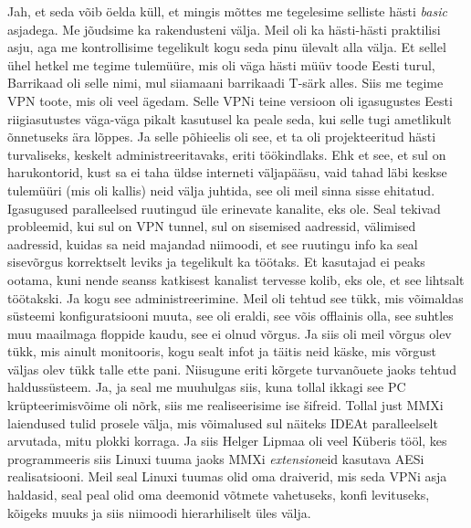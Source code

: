 Jah, et seda võib öelda küll, et mingis mõttes me tegelesime selliste hästi 
\emph{basic} asjadega. Me jõudsime ka rakendusteni välja. Meil oli ka 
hästi-hästi praktilisi asju, aga me kontrollisime tegelikult kogu seda pinu 
ülevalt alla välja. Et sellel ühel hetkel me tegime tulemüüre, mis oli väga 
hästi müüv toode Eesti turul, Barrikaad oli selle nimi, mul 
siiamaani barrikaadi T-särk alles. Siis me tegime VPN toote, mis oli veel 
ägedam. Selle VPNi teine versioon oli igasugustes Eesti riigiasutustes 
väga-väga pikalt kasutusel ka peale seda, kui selle tugi ametlikult õnnetuseks 
ära lõppes. Ja selle põhieelis oli see, et ta oli projekteeritud hästi 
turvaliseks, keskelt administreeritavaks, eriti töökindlaks. Ehk et see, et sul 
on  harukontorid, kust sa ei taha üldse interneti väljapääsu, vaid tahad läbi 
keskse tulemüüri (mis oli kallis) neid välja juhtida, see oli meil sinna sisse 
ehitatud. Igasugused paralleelsed ruutingud üle erinevate kanalite, eks ole. 
Seal tekivad probleemid, kui sul on VPN tunnel, sul on  sisemised aadressid, 
välimised aadressid, kuidas sa neid majandad niimoodi, et see ruutingu info ka 
seal sisevõrgus korrektselt leviks ja tegelikult ka töötaks. Et kasutajad 
ei peaks  ootama, kuni nende seanss katkisest kanalist tervesse kolib, eks ole, 
et see lihtsalt töötakski. Ja kogu see administreerimine. Meil oli tehtud see 
tükk, mis võimaldas süsteemi konfiguratsiooni muuta, see oli eraldi, see võis 
offlainis olla, see suhtles  muu maailmaga floppide kaudu, see ei olnud võrgus. 
Ja siis oli meil võrgus olev tükk, mis ainult monitooris, kogu sealt infot ja 
täitis neid käske, mis võrgust väljas olev tükk talle  ette pani. Niisugune 
eriti kõrgete turvanõuete jaoks tehtud haldussüsteem. Ja, ja seal me muuhulgas 
siis, kuna tollal ikkagi see PC krüpteerimisvõime oli nõrk, siis me 
realiseerisime ise  šifreid. Tollal just MMXi laiendused tulid prosele välja, 
mis võimalused sul näiteks IDEAt paralleelselt arvutada, mitu plokki korraga. Ja siis 
Helger Lipmaa oli veel Küberis tööl, kes 
programmeeris siis Linuxi tuuma jaoks MMXi \emph{extension}eid  kasutava 
AESi  
realisatsiooni. Meil seal Linuxi tuumas olid oma draiverid, mis 
seda VPNi asja haldasid, seal peal olid  oma deemonid võtmete vahetuseks, konfi 
levituseks, kõigeks muuks  ja siis niimoodi hierarhiliselt üles välja.

